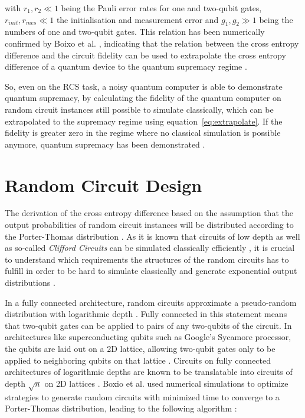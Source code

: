with $r_1, r_2 \ll 1$ being the Pauli error rates for one and two-qubit gates, $r_{init},
r_{mes} \ll 1$ the initialisation and measurement error and $g_1,g_2 \gg 1$ being the
numbers of one and two-qubit gates. This relation has been numerically confirmed by
Boixo et al. \cite{Boixo2018supremacy}, indicating that the relation between the
cross entropy difference and the circuit fidelity can be used to extrapolate the
cross entropy difference of a quantum device to the quantum supremacy regime \cite{Boixo2018supremacy}.

So, even on the RCS task, a noisy quantum computer is able to demonstrate quantum
supremacy, by calculating the fidelity of the quantum computer on random circuit instances still possible to simulate
classically, which can be extrapolated to the supremacy regime using
equation~\ref{eq:extrapolate}.
If the fidelity is greater zero in the regime where no classical simulation is possible anymore,
quantum supremacy has been demonstrated \cite{Boixo2018supremacy}.

\section{Random Circuit Design}

The derivation of the cross entropy difference based on the assumption that the
output probabilities of random circuit instances will be distributed according to
the Porter-Thomas distribution \cite{Boixo2018supremacy}. As it is known that circuits of low depth as
well as so-called \textit{Clifford Circuits} can be simulated classically
efficiently \cite{gottesman1998heisenberg}, it is crucial to understand which requirements the structures of
the random circuits has to fulfill in order to be hard to simulate classically and generate
exponential output distributions \cite{Boixo2018supremacy}.

In a fully connected architecture, random circuits approximate a pseudo-random
distribution with logarithmic depth \cite{harrow2008random}. Fully connected in this statement means
that two-qubit gates can be applied to pairs of any two-qubits of the circuit. In
architectures like superconducting qubits such as Google's Sycamore
processor, the qubits are laid out on a 2D lattice, allowing two-qubit gates only
to be applied to neighboring qubits on that lattice \cite{barends2014logic}. Circuits on fully
connected architectures of logarithmic depths are known to be translatable into
circuits of depth $\sqrt{n}$ on 2D lattices \cite{beals2013efficient}. Boxio et al. used numerical
simulations to optimize strategies to generate random circuits with minimized
time to converge to a Porter-Thomas distribution, leading to the following algorithm \cite{Boixo2018supremacy}:

